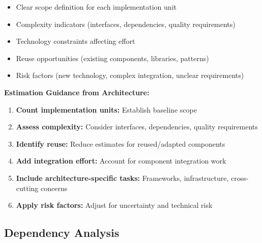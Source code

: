 \documentclass[11pt]{article}
\begin{document}
\begin{itemize}
    \item Clear scope definition for each implementation unit
    \item Complexity indicators (interfaces, dependencies, quality requirements)
    \item Technology constraints affecting effort
    \item Reuse opportunities (existing components, libraries, patterns)
    \item Risk factors (new technology, complex integration, unclear requirements)
\end{itemize}

\begin{bestpractice}
\textbf{Estimation Guidance from Architecture:}

\begin{enumerate}
    \item \textbf{Count implementation units:} Establish baseline scope
    \item \textbf{Assess complexity:} Consider interfaces, dependencies, quality requirements
    \item \textbf{Identify reuse:} Reduce estimates for reused/adapted components
    \item \textbf{Add integration effort:} Account for component integration work
    \item \textbf{Include architecture-specific tasks:} Frameworks, infrastructure, cross-cutting concerns
    \item \textbf{Apply risk factors:} Adjust for uncertainty and technical risk
\end{enumerate}
\end{bestpractice}

\subsection{Dependency Analysis}
\end{document}
